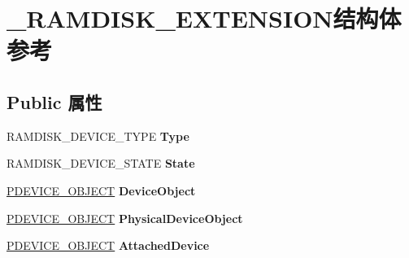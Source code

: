 \hypertarget{struct___r_a_m_d_i_s_k___e_x_t_e_n_s_i_o_n}{}\section{\+\_\+\+R\+A\+M\+D\+I\+S\+K\+\_\+\+E\+X\+T\+E\+N\+S\+I\+O\+N结构体 参考}
\label{struct___r_a_m_d_i_s_k___e_x_t_e_n_s_i_o_n}
\subsection*{Public 属性}
\begin{DoxyCompactItemize}
\item 
\mbox{\label{struct___r_a_m_d_i_s_k___e_x_t_e_n_s_i_o_n_abbeef52d7d73d6a4b10077fdb693d306}} 
R\+A\+M\+D\+I\+S\+K\+\_\+\+D\+E\+V\+I\+C\+E\+\_\+\+T\+Y\+PE {\bfseries Type}
\item 
\mbox{\label{struct___r_a_m_d_i_s_k___e_x_t_e_n_s_i_o_n_a44a9e0f4897bb88e89bee21562fba672}} 
R\+A\+M\+D\+I\+S\+K\+\_\+\+D\+E\+V\+I\+C\+E\+\_\+\+S\+T\+A\+TE {\bfseries State}
\item 
\mbox{\label{struct___r_a_m_d_i_s_k___e_x_t_e_n_s_i_o_n_a588441ba05dce97c63df69e79a46f908}} 
\hyperlink{struct___d_e_v_i_c_e___o_b_j_e_c_t}{P\+D\+E\+V\+I\+C\+E\+\_\+\+O\+B\+J\+E\+CT} {\bfseries Device\+Object}
\item 
\mbox{\label{struct___r_a_m_d_i_s_k___e_x_t_e_n_s_i_o_n_a6ebe9d60a184d66d7069b586e0513c65}} 
\hyperlink{struct___d_e_v_i_c_e___o_b_j_e_c_t}{P\+D\+E\+V\+I\+C\+E\+\_\+\+O\+B\+J\+E\+CT} {\bfseries Physical\+Device\+Object}
\item 
\mbox{\label{struct___r_a_m_d_i_s_k___e_x_t_e_n_s_i_o_n_aa4cc8271c63fec50a262cfc23d2dc4b1}} 
\hyperlink{struct___d_e_v_i_c_e___o_b_j_e_c_t}{P\+D\+E\+V\+I\+C\+E\+\_\+\+O\+B\+J\+E\+CT} {\bfseries Attached\+Device}
\item 
\mbox{\label{struct___r_a_m_d_i_s_k___e_x_t_e_n_s_i_o_n_ad415547352657f70ce4d87d34d0595cb}} 

\end{DoxyCompactItemize}
